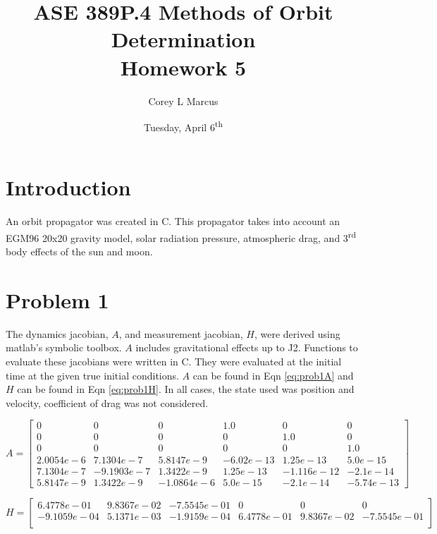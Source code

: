 \documentclass[11pt]{article}
\title{ASE 389P.4 Methods of Orbit Determination \\ Homework 5}
\author{Corey L Marcus} \date{Tuesday, April 6\textsuperscript{th}}
\def\CC{{C\nolinebreak[4]\hspace{-.05em}\raisebox{.4ex}{\tiny\bf ++}}}
\begin{document}
\onehalfspace
\maketitle


\section{Introduction}

An orbit propagator was created in \CC. This propagator takes into account an EGM96 20x20 gravity model, solar radiation pressure, atmospheric drag, and 3\textsuperscript{rd} body effects of the sun and moon. \\

\section{Problem 1}

The dynamics jacobian, $A$, and measurement jacobian, $H$, were derived using matlab's symbolic toolbox. $A$ includes gravitational effects up to J2. Functions to evaluate these jacobians were written in \CC. They were evaluated at the initial time at the given true initial conditions. $A$ can be found in Eqn \eqref{eq:prob1A} and $H$ can be found in Eqn \eqref{eq:prob1H}. In all cases, the state used was position and velocity, coefficient of drag was not considered.

\begin{equation}
\label{eq:prob1A}
A = \left[\begin{array}{cccccc} 0 & 0 & 0 & 1.0 & 0 & 0\\ 0 & 0 & 0 & 0 & 1.0 & 0\\ 0 & 0 & 0 & 0 & 0 & 1.0\\ 2.0054e-6 & 7.1304e-7 & 5.8147e-9 & -6.02e-13 & 1.25e-13 & 5.0e-15\\ 7.1304e-7 & -9.1903e-7 & 1.3422e-9 & 1.25e-13 & -1.116e-12 & -2.1e-14\\ 5.8147e-9 & 1.3422e-9 & -1.0864e-6 & 5.0e-15 & -2.1e-14 & -5.74e-13 \end{array}\right]
\end{equation}

\begin{equation}
\label{eq:prob1H}
H = \begin{bmatrix}
6.4778e-01  & 9.8367e-02 & -7.5545e-01     &       0       &     0     &       0 \\
-9.1059e-04 &  5.1371e-03 &  -1.9159e-04  & 6.4778e-01 &  9.8367e-02 &  -7.5545e-01 \\
\end{bmatrix}
\end{equation}
\end{document}
